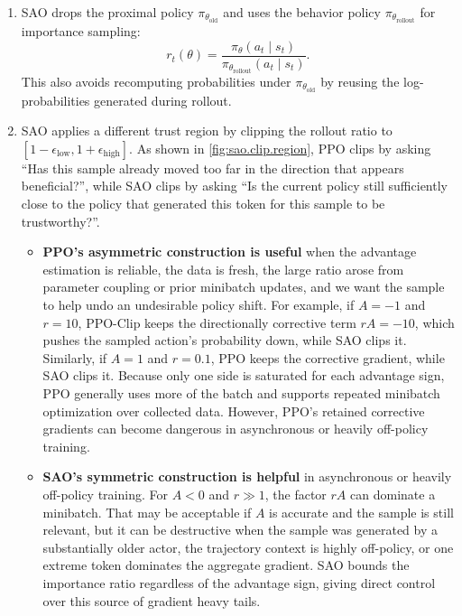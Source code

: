 \begin{enumerate}
    \item SAO drops the proximal policy $\pi_{\theta_{\text{old}}}$ and uses the behavior policy $\pi_{\theta_{\text{rollout}}}$ for importance sampling:
    \[
        r_t(\theta)
        =
        \frac{\pi_{\theta}(a_t\mid s_t)}
             {\pi_{\theta_{\text{rollout}}}(a_t\mid s_t)}.
    \]
    This also avoids recomputing probabilities under $\pi_{\theta_{\text{old}}}$ by reusing the log-probabilities generated during rollout.

    \item SAO applies a different trust region by clipping the rollout ratio to $[1-\epsilon_{\text{low}},1+\epsilon_{\text{high}}]$. As shown in \autoref{fig:sao.clip.region}, PPO clips by asking ``Has this sample already moved too far in the direction that appears beneficial?'', while SAO clips by asking ``Is the current policy still sufficiently close to the policy that generated this token for this sample to be trustworthy?''.
    \begin{itemize}
        \item \textbf{PPO's asymmetric construction is useful} when the advantage estimation is reliable, the data is fresh, the large ratio arose from parameter coupling or prior minibatch updates, and we want the sample to help undo an undesirable policy shift. For example, if $A=-1$ and $r=10$, PPO-Clip keeps the directionally corrective term $rA=-10$, which pushes the sampled action's probability down, while SAO clips it. Similarly, if $A=1$ and $r=0.1$, PPO keeps the corrective gradient, while SAO clips it. Because only one side is saturated for each advantage sign, PPO generally uses more of the batch and supports repeated minibatch optimization over collected data. However, PPO's retained corrective gradients can become dangerous in asynchronous or heavily off-policy training.
        \item \textbf{SAO's symmetric construction is helpful} in asynchronous or heavily off-policy training. For $A<0$ and $r\gg1$, the factor $rA$ can dominate a minibatch. That may be acceptable if $A$ is accurate and the sample is still relevant, but it can be destructive when the sample was generated by a substantially older actor, the trajectory context is highly off-policy, or one extreme token dominates the aggregate gradient. SAO bounds the importance ratio regardless of the advantage sign, giving direct control over this source of gradient heavy tails.
    \end{itemize}


\end{enumerate}
